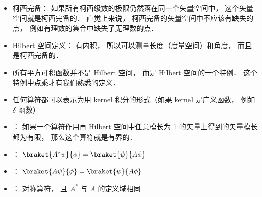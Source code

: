 
\begin{itemize}
\item 柯西完备： 如果所有柯西级数的极限仍然落在同一个矢量空间中， 这个矢量空间就是柯西完备的． 直觉上来说， 柯西完备的矢量空间中不应该有缺失的点， 例如有理数的集合中缺失了无理数的点．
\item Hilbert 空间定义： 有内积， 所以可以测量长度（度量空间）和角度， 而且是柯西完备的．
\item 所有平方可积函数并不是 Hilbert 空间， 而是 Hilbert 空间的一个特例． 这个特例中点乘才有我们熟悉的定义．
\item 任何算符都可以表示为用 kernel 积分的形式（如果 kernel 是广义函数， 例如 $\delta$ 函数）
\item {}： 如果一个算符作用再 Hilbert 空间中任意模长为 1 的矢量上得到的矢量模长都为有限， 那么这个算符就是有界的．
\item {}： $\braket{A^* \psi}{\phi} = \braket{\psi}{A \phi}$
\item {}： $\braket{A \psi}{\phi} = \braket{\psi}{A \phi}$
\item {}： 对称算符， 且 $A^*$ 与 $A$ 的定义域相同
\end{itemize}
